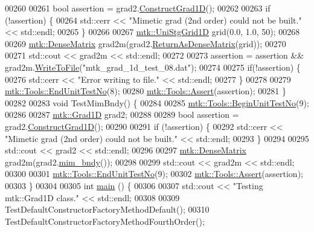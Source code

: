 \begin{DoxyCode}
00260 
00261   \textcolor{keywordtype}{bool} assertion = grad2.\hyperlink{classmtk_1_1Grad1D_a74ef5245cfae6fd158bd7f563a0c2e52}{ConstructGrad1D}();
00262 
00263   \textcolor{keywordflow}{if} (!assertion) \{
00264     std::cerr << \textcolor{stringliteral}{"Mimetic grad (2nd order) could not be built."} << std::endl;
00265   \}
00266 
00267   \hyperlink{classmtk_1_1UniStgGrid1D}{mtk::UniStgGrid1D} grid(0.0, 1.0, 50);
00268 
00269   \hyperlink{classmtk_1_1DenseMatrix}{mtk::DenseMatrix} grad2m(grad2.\hyperlink{classmtk_1_1Grad1D_a77b2eddbe4ab03f469306c604d505b1a}{ReturnAsDenseMatrix}(grid));
00270 
00271   std::cout << grad2m << std::endl;
00272 
00273   assertion = assertion && grad2m.\hyperlink{classmtk_1_1DenseMatrix_ab396804fb5f188e1eaa8578c738c59fc}{WriteToFile}(\textcolor{stringliteral}{"mtk\_grad\_1d\_test\_08.dat"});
00274 
00275   \textcolor{keywordflow}{if}(!assertion) \{
00276     std::cerr << \textcolor{stringliteral}{"Error writing to file."} << std::endl;
00277   \}
00278 
00279   \hyperlink{classmtk_1_1Tools_aba67d9dc35c9c1c49430fcc9ea035e03}{mtk::Tools::EndUnitTestNo}(8);
00280   \hyperlink{classmtk_1_1Tools_ac6804df469c94ab6a796fb64f1e44a89}{mtk::Tools::Assert}(assertion);
00281 \}
00282 
00283 \textcolor{keywordtype}{void} TestMimBndy() \{
00284 
00285   \hyperlink{classmtk_1_1Tools_afc29ecaf337a13ed2e817d3890a5a441}{mtk::Tools::BeginUnitTestNo}(9);
00286 
00287   \hyperlink{classmtk_1_1Grad1D}{mtk::Grad1D} grad2;
00288 
00289   \textcolor{keywordtype}{bool} assertion = grad2.\hyperlink{classmtk_1_1Grad1D_a74ef5245cfae6fd158bd7f563a0c2e52}{ConstructGrad1D}();
00290 
00291   \textcolor{keywordflow}{if} (!assertion) \{
00292     std::cerr << \textcolor{stringliteral}{"Mimetic grad (2nd order) could not be built."} << std::endl;
00293   \}
00294 
00295   std::cout << grad2 << std::endl;
00296 
00297   \hyperlink{classmtk_1_1DenseMatrix}{mtk::DenseMatrix} grad2m(grad2.\hyperlink{classmtk_1_1Grad1D_ab25e1d064a5a00fbe3777e65fd5750c0}{mim\_bndy}());
00298 
00299   std::cout << grad2m << std::endl;
00300 
00301   \hyperlink{classmtk_1_1Tools_aba67d9dc35c9c1c49430fcc9ea035e03}{mtk::Tools::EndUnitTestNo}(9);
00302   \hyperlink{classmtk_1_1Tools_ac6804df469c94ab6a796fb64f1e44a89}{mtk::Tools::Assert}(assertion);
00303 \}
00304 
00305 \textcolor{keywordtype}{int} \hyperlink{mtk__grad__1d__test_8cc_ae66f6b31b5ad750f1fe042a706a4e3d4}{main} () \{
00306 
00307   std::cout << \textcolor{stringliteral}{"Testing mtk::Grad1D class."} << std::endl;
00308 
00309   TestDefaultConstructorFactoryMethodDefault();
00310   TestDefaultConstructorFactoryMethodFourthOrder();

\end{DoxyCode}
